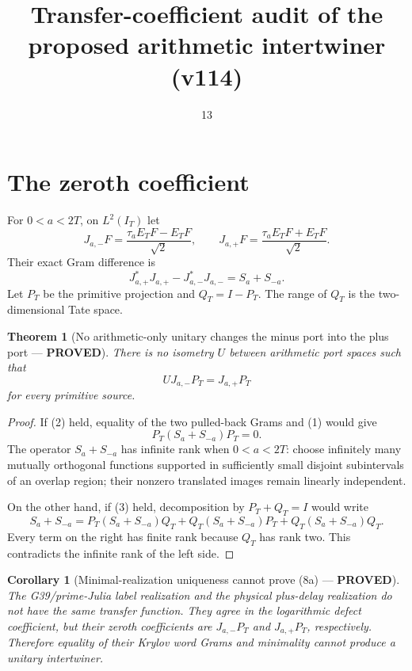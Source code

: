 \documentclass[11pt]{article}
\title{Transfer-coefficient audit of the proposed arithmetic intertwiner (v114)}
\date{13}
\newcommand{\PROVED}{\textcolor{green!40!black}{\textbf{PROVED}}}
\newtheorem{theorem}{Theorem}
\newtheorem{corollary}{Corollary}
\begin{document}
\maketitle

\section{The zeroth coefficient}

For $0<a<2T$, on $L^2(I_T)$ let
\[
 J_{a,-}F=\frac{\tau_aE_TF-E_TF}{\sqrt2},
 \qquad
 J_{a,+}F=\frac{\tau_aE_TF+E_TF}{\sqrt2}.
\]
Their exact Gram difference is
\begin{equation}
 J_{a,+}^*J_{a,+}-J_{a,-}^*J_{a,-}=S_a+S_{-a}.                 \tag{1}
\end{equation}
Let $P_T$ be the primitive projection and $Q_T=I-P_T$.  The range of
$Q_T$ is the two-dimensional Tate space.

\begin{theorem}[No arithmetic-only unitary changes the minus port into the
plus port --- \PROVED]
There is no isometry $U$ between arithmetic port spaces such that
\begin{equation}
                         UJ_{a,-}P_T=J_{a,+}P_T                 \tag{2}
\end{equation}
for every primitive source.
\end{theorem}

\begin{proof}
If (2) held, equality of the two pulled-back Grams and (1) would give
\begin{equation}
                         P_T(S_a+S_{-a})P_T=0.                 \tag{3}
\end{equation}
The operator $S_a+S_{-a}$ has infinite rank when $0<a<2T$: choose
infinitely many mutually orthogonal functions supported in sufficiently
small disjoint subintervals of an overlap region; their nonzero translated
images remain linearly independent.

On the other hand, if (3) held, decomposition by $P_T+Q_T=I$ would write
\[
 S_a+S_{-a}=P_T(S_a+S_{-a})Q_T
            +Q_T(S_a+S_{-a})P_T
            +Q_T(S_a+S_{-a})Q_T.
\]
Every term on the right has finite rank because $Q_T$ has rank two.  This
contradicts the infinite rank of the left side.
\end{proof}

\begin{corollary}[Minimal-realization uniqueness cannot prove (8a) ---
\PROVED]
The G39/prime-Julia label realization and the physical plus-delay
realization do not have the same transfer function.  They agree in the
logarithmic defect coefficient, but their zeroth coefficients are
$J_{a,-}P_T$ and $J_{a,+}P_T$, respectively.  Therefore equality of their
Krylov word Grams and minimality cannot produce a unitary intertwiner.
\end{corollary}
\end{document}
